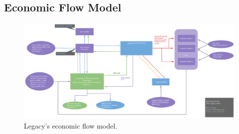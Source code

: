 \begin{appendices}
\chapter{Economic Flow Model} %
\label{cha:economic_flow_model}
\begin{figure}
	\centering
	\includegraphics[scale=0.4]{fig/profit_sharing_model_v02.pdf}
	\caption{Legacy's economic flow model.}
	\label{fig:economic_flow}
\end{figure}

\end{appendices}
